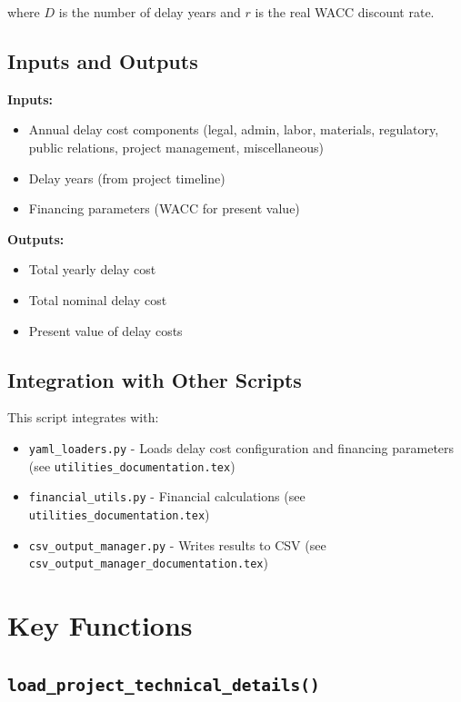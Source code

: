 \documentclass[12pt]{article}
\begin{document}
where $D$ is the number of delay years and $r$ is the real WACC discount rate.

\subsection{Inputs and Outputs}

\textbf{Inputs:}
\begin{itemize}
    \item Annual delay cost components (legal, admin, labor, materials, regulatory, public relations, project management, miscellaneous)
    \item Delay years (from project timeline)
    \item Financing parameters (WACC for present value)
\end{itemize}

\textbf{Outputs:}
\begin{itemize}
    \item Total yearly delay cost
    \item Total nominal delay cost
    \item Present value of delay costs
\end{itemize}

\subsection{Integration with Other Scripts}

This script integrates with:
\begin{itemize}
    \item \texttt{yaml\_loaders.py} - Loads delay cost configuration and financing parameters (see \texttt{utilities\_documentation.tex})
    \item \texttt{financial\_utils.py} - Financial calculations (see \texttt{utilities\_documentation.tex})
    \item \texttt{csv\_output\_manager.py} - Writes results to CSV (see \texttt{csv\_output\_manager\_documentation.tex})
\end{itemize}

\section{Key Functions}

\subsection{\texttt{load\_project\_technical\_details()}}
\end{document}
